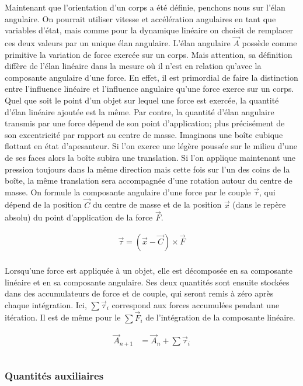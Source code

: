 Maintenant que l'orientation d'un corps a été définie, penchons nous
sur l'élan angulaire. On pourrait utiliser vitesse et accélération
angulaires en tant que variables d'état, mais comme pour la dynamique
linéaire on choisit de remplacer ces deux valeurs par un unique élan
angulaire. L'élan angulaire $\vec A$ possède comme primitive la
variation de force exercée sur un corps. Mais attention, sa définition
diffère de l'élan linéaire dans la mesure o\`u il n'est en relation
qu'avec la composante angulaire d'une force. En effet, il est
primordial de faire la distinction entre l'influence linéaire et
l'influence angulaire qu'une force exerce sur un corps. Quel que soit
le point d'un objet sur lequel une force est exercée, la quantité
d'élan linéaire ajoutée est la même. Par contre, la quantité d'élan
angulaire transmis par une force dépend de son point d'application;
plus précisément de son excentricité par rapport au centre de
masse. Imaginons une boîte cubique flottant en état d'apesanteur. Si
l'on exerce une légère poussée sur le milieu d'une de ses faces alors
la boîte subira une translation. Si l'on applique maintenant une
pression toujours dans la même direction mais cette fois sur l'un des
coins de la boîte, la même translation sera accompagnée d'une rotation
autour du centre de masse. On formule la composante angulaire d'une
force par le couple $\vec{\tau}$, qui dépend de la position $\vec C$
du centre de masse et de la position $\vec x$ (dans le repère absolu)
du point d'application de la force $\vec{F}$.

\begin{align*}
  \vec{\tau} = (\vec{x} - \vec{C}) \times \vec{F} \\
\end{align*}

Lorsqu'une force est appliquée à un objet, elle est décomposée en sa
composante linéaire et en sa composante angulaire. Ses deux quantités
sont ensuite stockées dans des accumulateurs de force et de couple,
qui seront remis à zéro après chaque intégration. Ici, $\sum
\vec{\tau}_i$ correspond aux forces accumulées pendant une
itération. Il est de même pour le $\sum \vec{F}_i$ de l'intégration de
la composante linéaire.

\begin{align*}
  \vec{A}_{n+1} &= \vec{A}_n + {\sum \vec{\tau}_i} \\ \\
\end{align*}

\subsubsection{Quantités auxiliaires}

